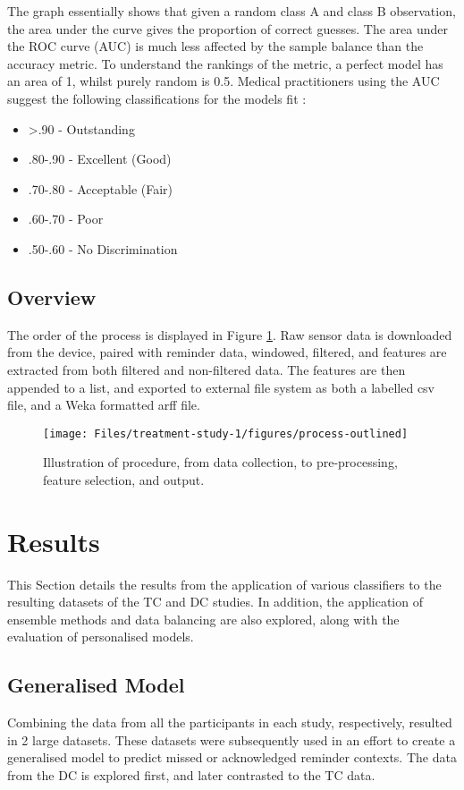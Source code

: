 The graph essentially shows that given a random class A and class B observation, the area under the curve gives the proportion of correct guesses. The area under the ROC curve (AUC) is much less affected by the sample balance than the accuracy metric. To understand the rankings of the metric, a perfect model has an area of 1, whilst purely random is 0.5.
Medical practitioners using the AUC suggest the following classifications for the models fit \cite{Tape}:
\begin{itemize}[noitemsep,topsep=0pt]
  \item \textgreater .90 - Outstanding
  \item .80-.90 - Excellent (Good)
  \item .70-.80 - Acceptable (Fair)
  \item .60-.70 - Poor
  \item .50-.60 - No Discrimination
\end{itemize}


\subsection{Overview}
The order of the process is displayed in Figure \ref{fig: process-overview}. Raw sensor data is downloaded from the device, paired with reminder data, windowed, filtered, and features are extracted from both filtered and non-filtered data. The features are then appended to a list, and exported to external file system as both a labelled csv file, and a Weka formatted arff file.

\begin{figure}[h]
    \centering
        \texttt{[image: Files/treatment-study-1/figures/process-outlined]}
        \caption{Illustration of procedure, from data collection, to pre-processing, feature selection, and output.}
        \label{fig: process-overview}
\end{figure}

\section{Results} \label{section: taut-results}
This Section details the results from the application of various classifiers to the resulting datasets of the TC and DC studies. In addition, the application of ensemble methods and data balancing are also explored, along with the evaluation of personalised models.

\subsection{Generalised Model}
Combining the data from all the participants in each study, respectively, resulted in 2 large datasets. These datasets were subsequently used in an effort to create a generalised model to predict missed or acknowledged reminder contexts. The data from the DC is explored first, and later contrasted to the TC data.

